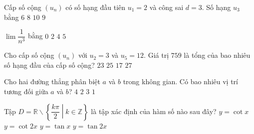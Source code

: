 \begin{name}
	{\tenchude}
	{\tendethi}
	{\tentruong}
	{\thoigian}
\end{name}
\setcounter{ex}{0}\setcounter{bt}{0}
\begin{ex}%
	Cấp số cộng $(u_n)$ có số hạng đầu tiên $u_1=2$ và công sai $d=3$. Số hạng $u_3$ bằng
	\choice
	{$6$}
	{\True $8$}
	{$10$}
	{$9$}
\end{ex}

\begin{ex}%
	$\lim\dfrac{1}{n^3}$ bằng
	\choice
	{\True $0$}
	{$2$}
	{$4$}
	{$5$}
\end{ex}

\begin{ex}%
	Cho cấp số cộng $(u_n)$ với $u_2=3$ và $u_5=12$. Giá trị $759$ là tổng của bao nhiêu số hạng đầu của cấp số cộng?
	\choice
	{\True $23$}
	{$25$}
	{$17$}
	{$27$}
\end{ex}

\begin{ex}%
	Cho hai đường thẳng phân biệt $a$ và $b$ trong không gian. Có bao nhiêu vị trí tương đối giữa $a$ và $b$?
	\choice
	{$4$}
	{$2$}
	{\True $3$}
	{$1$}
\end{ex}

\begin{ex}%
	Tập $D=\mathbb{R}\backslash \left\{ \dfrac{k\pi }{2}\middle| k\in \mathbb{Z} \right\}$ là tập xác định của hàm số nào sau đây?
	\choice
	{ $y=\cot x$}
	{\True  $y=\cot 2x$}
	{ $y=\tan x$}
	{ $y=\tan 2x$}
\end{ex}

